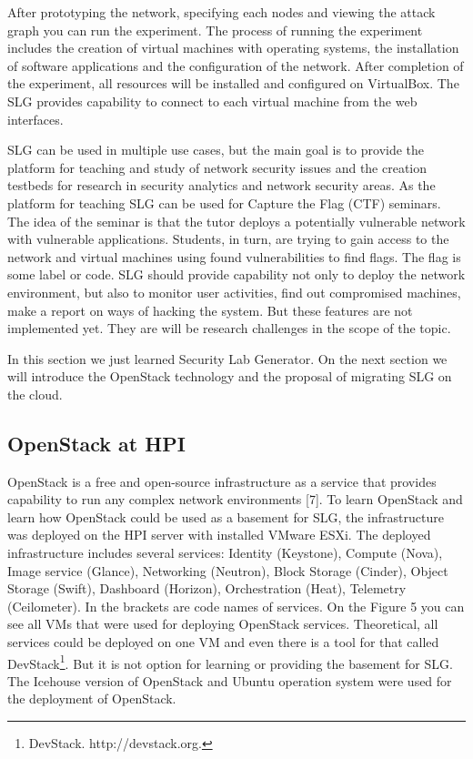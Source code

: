 After prototyping the network, specifying each nodes and viewing the attack graph you can run the experiment. The process of running the experiment includes the creation of virtual machines with operating systems, the installation of software applications and the configuration of the network. After completion of the experiment, all resources will be installed and configured on VirtualBox. The SLG provides capability to connect to each virtual machine from the web interfaces. 


SLG can be used in multiple use cases, but the main goal is to provide the platform for teaching and study of network security issues and the creation testbeds for research in security analytics and network security areas. 
As the platform for teaching SLG can be used for Capture the Flag (CTF) seminars. The idea of the seminar is that the tutor deploys a potentially vulnerable network with vulnerable applications. Students, in turn, are trying to gain access to the network and virtual machines using found vulnerabilities to find flags. The flag is some label or code. SLG should provide capability not only to deploy the network environment, but also to monitor user activities, find out compromised machines, make a report on ways of hacking the system. But these features are not implemented yet.  They are will be research challenges in the scope of the topic.
  
  
In this section we just learned Security Lab Generator. On the next section we will introduce the OpenStack technology and the proposal of migrating SLG on the cloud.


 




\subsection{OpenStack at HPI}
OpenStack is a free and open-source infrastructure as a service that provides capability to run any complex network environments [7]. To learn OpenStack and learn how OpenStack could be used as a basement for SLG, the infrastructure was deployed on the HPI server with installed VMware ESXi. The deployed infrastructure includes several services: Identity (Keystone), Compute (Nova), Image service (Glance), Networking (Neutron), Block Storage (Cinder), Object Storage (Swift), Dashboard (Horizon), Orchestration (Heat), Telemetry (Ceilometer). In the brackets are code names of services. On the Figure 5 you can see all VMs that were used for deploying OpenStack services. Theoretical, all services could be deployed on one VM and even there is a tool for that called DevStack\footnote{DevStack. http://devstack.org.}. But it is not option for learning or providing the basement for SLG. The Icehouse version of OpenStack and Ubuntu operation system were used for the deployment of OpenStack.  

